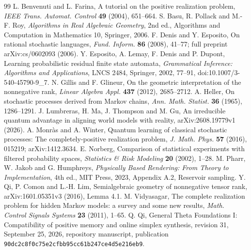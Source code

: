 \begin{thebibliography}{99}
 L. Benvenuti and L. Farina,
A tutorial on the positive realization problem,
\emph{IEEE Trans. Automat. Control} \textbf{49} (2004), 651--664.
 S. Basu, R. Pollack and M.-F. Roy,
\emph{Algorithms in Real Algebraic Geometry}, 2nd ed.,
Algorithms and Computation in Mathematics 10, Springer, 2006.
 F. Denis and Y. Esposito,
On rational stochastic languages,
\emph{Fund. Inform.} \textbf{86} (2008), 41--77;
full preprint arXiv:cs/0602093 (2006).
 Y. Esposito, A. Lemay, F. Denis and P. Dupont,
Learning probabilistic residual finite state automata,
\emph{Grammatical Inference: Algorithms and Applications},
LNCS 2484, Springer, 2002, 77--91,
doi:10.1007/3-540-45790-9\_7.
 N. Gillis and F. Glineur,
On the geometric interpretation of the nonnegative rank,
\emph{Linear Algebra Appl.} \textbf{437} (2012), 2685--2712.
 A. Heller, On stochastic processes derived from Markov chains,
\emph{Ann. Math. Statist.} \textbf{36} (1965), 1286--1291.
 J. Lumbreras, H. Ma, J. Thompson and M. Gu,
An irreducible quantum advantage in aligning world models with reality,
arXiv:2608.19779v1 (2026).
 A. Monr\`as and A. Winter,
Quantum learning of classical stochastic processes:
The completely-positive realization problem,
\emph{J. Math. Phys.} \textbf{57} (2016), 015219;
arXiv:1412.3634.
 E. Norberg,
Comparison of statistical experiments with filtered probability spaces,
\emph{Statistics \& Risk Modeling} \textbf{20} (2002), 1--28.
 M. Pharr, W. Jakob and G. Humphreys,
\emph{Physically Based Rendering: From Theory to Implementation},
4th ed., MIT Press, 2023, Appendix A.2, Reservoir sampling.
 Y. Qi, P. Comon and L.-H. Lim,
Semialgebraic geometry of nonnegative tensor rank,
arXiv:1601.05351v3 (2016), Lemma 4.1.
 M. Vidyasagar,
The complete realization problem for hidden Markov models: a survey
and some new results,
\emph{Math. Control Signals Systems} \textbf{23} (2011), 1--65.
 Q. Qi,
General Theta Foundations I: Compatibility of positive memory and online
simplex synthesis, revision 31, September 25, 2026,
repository manuscript, publication
\texttt{90dc2c8f0c75e2cfbb95cc61b247ce4d5e216eb9}.
\end{thebibliography}
